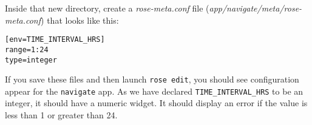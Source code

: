 Inside that new directory, create a {\em rose-meta.conf} file ({\em app/navigate/meta/rose-meta.conf}) that looks like this:

\lstset{language=suiterc}
\begin{lstlisting}[columns=fullflexible]
[env=TIME_INTERVAL_HRS]
range=1:24
type=integer
\end{lstlisting}

If you save these files and then launch \lstinline{rose edit}, you should see configuration appear for the \lstinline{navigate} app. As we have declared \lstinline{TIME_INTERVAL_HRS} to be an integer, it should have a numeric widget. It should display an error if the value is less than 1 or greater than 24.

